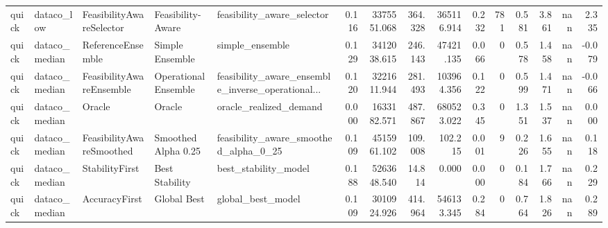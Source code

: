 \begin{table}
{\begin{tabular}{lllllrrrrrrrrrr}
   quick &     dataco\_low &  FeasibilityAwareSelector &     Feasibility-Aware &                         feasibility\_aware\_selector & 0.116 &     3375551.068 &              364.328 &         365116.914 &                     0.232 &                 781 &                       0.581 &                  3.861 &               nan &                  2.335 \\
   quick &  dataco\_median &         ReferenceEnsemble &       Simple Ensemble &                                    simple\_ensemble & 0.129 &     3412038.615 &              246.143 &          47421.135 &                     0.066 &                   0 &                       0.578 &                  1.458 &               nan &                 -0.079 \\
   quick &  dataco\_median &  FeasibilityAwareEnsemble &  Operational Ensemble &  feasibility\_aware\_ensemble\_inverse\_operational... & 0.120 &     3221611.944 &              281.493 &         103964.356 &                     0.122 &                   0 &                       0.599 &                  1.471 &               nan &                 -0.066 \\
   quick &  dataco\_median &                    Oracle &                Oracle &                             oracle\_realized\_demand & 0.000 &     1633182.571 &              487.867 &         680523.022 &                     0.345 &                   0 &                       1.351 &                  1.537 &               nan &                  0.000 \\
   quick &  dataco\_median &  FeasibilityAwareSmoothed &   Smoothed Alpha 0.25 &              feasibility\_aware\_smoothed\_alpha\_0\_25 & 0.109 &     4515961.102 &              109.008 &            102.215 &                     0.001 &                   9 &                       0.226 &                  1.655 &               nan &                  0.118 \\
   quick &  dataco\_median &            StabilityFirst &        Best Stability &                               best\_stability\_model & 0.188 &     5263648.540 &               14.814 &              0.000 &                     0.000 &                   0 &                       0.184 &                  1.766 &               nan &                  0.229 \\
   quick &  dataco\_median &             AccuracyFirst &           Global Best &                                  global\_best\_model & 0.109 &     3010924.926 &              414.964 &         546133.345 &                     0.284 &                   0 &                       0.764 &                  1.826 &               nan &                  0.289 \\

\end{tabular}}
\end{table}

